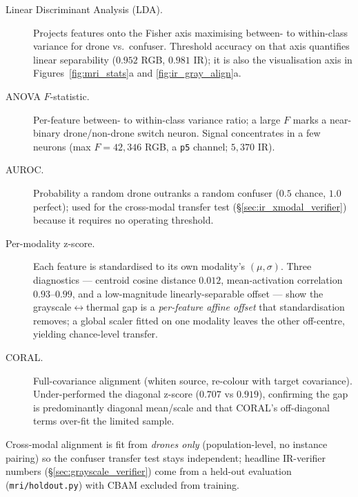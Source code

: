 \begin{description}
    \item[Linear Discriminant Analysis (LDA).] Projects features onto the Fisher axis maximising between- to within-class variance for drone vs.\ confuser. Threshold accuracy on that axis quantifies linear separability ($0.952$ RGB, $0.981$ IR); it is also the visualisation axis in Figures~\ref{fig:mri_stats}a and \ref{fig:ir_gray_align}a.
    \item[ANOVA $F$-statistic.] Per-feature between- to within-class variance ratio; a large $F$ marks a near-binary drone/non-drone switch neuron. Signal concentrates in a few neurons (max $F=42{,}346$ RGB, a \texttt{p5} channel; $5{,}370$ IR).
    \item[AUROC.] Probability a random drone outranks a random confuser ($0.5$ chance, $1.0$ perfect); used for the cross-modal transfer test (\S\ref{sec:ir_xmodal_verifier}) because it requires no operating threshold.
    \item[Per-modality z-score.] Each feature is standardised to its own modality's $(\mu,\sigma)$. Three diagnostics --- centroid cosine distance $0.012$, mean-activation correlation $0.93$--$0.99$, and a low-magnitude linearly-separable offset --- show the grayscale$\leftrightarrow$thermal gap is a \emph{per-feature affine offset} that standardisation removes; a global scaler fitted on one modality leaves the other off-centre, yielding chance-level transfer.
    \item[CORAL.] Full-covariance alignment (whiten source, re-colour with target covariance). Under-performed the diagonal z-score ($0.707$ vs $0.919$), confirming the gap is predominantly diagonal mean/scale and that CORAL's off-diagonal terms over-fit the limited sample.
\end{description}

Cross-modal alignment is fit from \emph{drones only} (population-level, no instance pairing) so the confuser transfer test stays independent; headline IR-verifier numbers (\S\ref{sec:grayscale_verifier}) come from a held-out evaluation (\texttt{mri/holdout.py}) with CBAM excluded from training.

